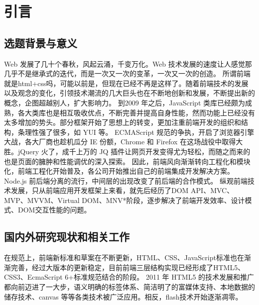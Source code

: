 
\chapter{引言}
\label{cha:introduction}
\section{选题背景与意义}
\label{sec:background}
Web 发展了几十个春秋，风起云涌，千变万化。Web 技术发展的速度让人感觉那几乎不是继承式的迭代，而是一次又一次的变革，一次又一次的创造。
所谓前端就是html+css吗，可能以前是，但现在已经不再是这样了。随着前端技术的发展以及观念的变化，引领技术潮流的几大巨头也在不断地创新和发展，不断提出新的概念，企图超越别人，扩大影响力。
到2009 年之后，JavaScript 类库已经颇为成熟，各大类库也是相互吸收优点，不断完善并提高自身性能，然而功能上已经没有太多增加的势头。部分框架开始了思想上的转变，更加注重前端开发的组织和结构，条理性强了很多，如 YUI 等。
ECMAScript 规范的争执，开启了浏览器引擎大战，各大厂商也趁机瓜分 IE 份额，Chrome 和 Firefox 在这场战役中取得大胜。jQuery 火了，成千上万的 JQ 插件让网页开发变得尤为轻松，而随之而来的也是页面的臃肿和性能调优的深入探索。
因此，前端风向渐渐转向工程化和模块化，前端工程化开始普及，各公司开始推出自己的前端集成开发解决方案。Node.js 前后端分离的流行，中间层的出现改变了前后端的合作模式\cite{2016Tech}。
纵观前端技术发展，只从前端应用开发框架上来看，就先后经历了DOM API、MVC、MVP、MVVM、Virtual DOM、MNV*阶段，逐步解决了前端开发效率、设计模式、DOM交互性能的问题。


\section{国内外研究现状和相关工作}
\label{sec:related_work}
	在规范上，前端新标准和草案在不断更新，HTML、CSS、JavaScript标准也在渐渐完善，经过大版本的更新稳定，目前前端三层结构实现已经形成了HTML5、CSS3、EcmaScript 6+标准规范结合的阶段。
	2011 年 HTML5 的技术发展和推广都向前迈进了一大步，语义明确的标签体系、简洁明了的富媒体支持、本地数据的储存技术、canvas 等等各类技术被广泛应用。相反，flash技术开始逐渐凋零。

